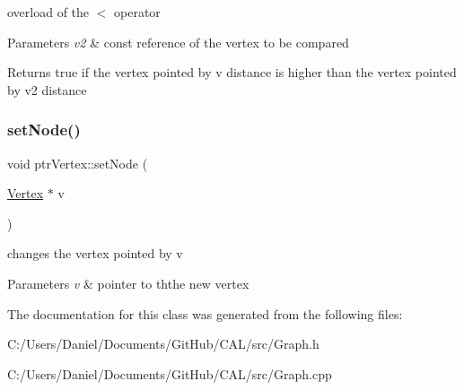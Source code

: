 overload of the $<$ operator 


\begin{DoxyParams}{Parameters}
{\em v2} & const reference of the vertex to be compared\\
\hline
\end{DoxyParams}
\begin{DoxyReturn}{Returns}
true if the vertex pointed by v distance is higher than the vertex pointed by v2 distance 
\end{DoxyReturn}
\hypertarget{classptr_vertex_aeb0df2a84ad85a3160a8826bdb0262c1}{}\label{classptr_vertex_aeb0df2a84ad85a3160a8826bdb0262c1} 
\subsubsection{\texorpdfstring{set\+Node()}{setNode()}}
{\footnotesize\ttfamily void ptr\+Vertex\+::set\+Node (\begin{DoxyParamCaption}\item[{\hyperlink{class_vertex}{Vertex} $\ast$}]{v }\end{DoxyParamCaption})}



changes the vertex pointed by v 


\begin{DoxyParams}{Parameters}
{\em v} & pointer to ththe new vertex \\
\hline
\end{DoxyParams}


The documentation for this class was generated from the following files\+:\begin{DoxyCompactItemize}
\item 
C\+:/\+Users/\+Daniel/\+Documents/\+Git\+Hub/\+C\+A\+L/src/Graph.\+h\item 
C\+:/\+Users/\+Daniel/\+Documents/\+Git\+Hub/\+C\+A\+L/src/Graph.\+cpp\end{DoxyCompactItemize}
